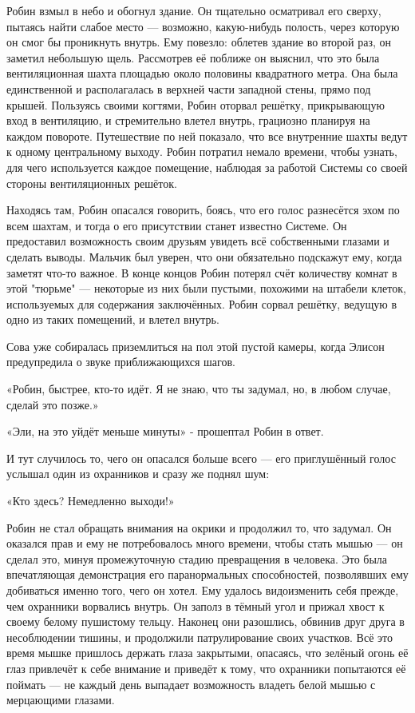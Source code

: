 \documentclass[a4paper,12pt]{book}
\begin{document}
\par
Робин взмыл в небо и обогнул здание. Он тщательно осматривал его сверху, пытаясь найти слабое место — возможно, какую-нибудь полость, через которую он смог бы проникнуть внутрь. Ему повезло: облетев здание во второй раз, он заметил небольшую щель. Рассмотрев её поближе он выяснил, что это была вентиляционная шахта площадью около половины квадратного метра. Она была единственной и располагалась в верхней части западной стены, прямо под крышей. Пользуясь своими когтями, Робин оторвал решётку, прикрывающую вход в вентиляцию, и стремительно влетел внутрь, грациозно планируя на каждом повороте. Путешествие по ней показало, что все внутренние шахты ведут к одному центральному выходу. Робин потратил немало времени, чтобы узнать, для чего используется каждое помещение, наблюдая за работой Системы со своей стороны вентиляционных решёток.
\par
Находясь там, Робин опасался говорить, боясь, что его голос разнесётся эхом по всем шахтам, и тогда о его присутствии станет известно Системе. Он предоставил возможность своим друзьям увидеть всё собственными глазами и сделать выводы. Мальчик был уверен, что они обязательно подскажут ему, когда заметят что-то важное. В конце концов Робин потерял счёт количеству комнат в этой "тюрьме" — некоторые из них были пустыми, похожими на штабели клеток, используемых для содержания заключённых. Робин сорвал решётку, ведущую в одно из таких помещений, и влетел внутрь.\\
\par
Сова уже собиралась приземлиться на пол этой пустой камеры, когда Элисон предупредила о звуке приближающихся шагов.
\par
«Робин, быстрее, кто-то идёт. Я не знаю, что ты задумал, но, в любом случае, сделай это позже.»
\par
«Эли, на это уйдёт меньше минуты» - прошептал Робин в ответ.
\par
И тут случилось то, чего он опасался больше всего — его приглушённый голос услышал один из охранников и сразу же поднял шум:
\par
«Кто здесь? Немедленно выходи!»
\par
Робин не стал обращать внимания на окрики и продолжил то, что задумал. Он оказался прав и ему не потребовалось много времени, чтобы стать мышью — он сделал это, минуя промежуточную стадию превращения в человека. Это была впечатляющая демонстрация его паранормальных способностей, позволявших ему добиваться именно того, чего он хотел. Ему удалось видоизменить себя прежде, чем охранники ворвались внутрь. Он заполз в тёмный угол и прижал хвост к своему белому пушистому тельцу. Наконец они разошлись, обвинив друг друга в несоблюдении тишины, и продолжили патрулирование своих участков. Всё это время мышке пришлось держать глаза закрытыми, опасаясь, что зелёный огонь её глаз привлечёт к себе внимание и приведёт к тому, что охранники попытаются её поймать — не каждый день выпадает возможность владеть белой мышью с мерцающими глазами.
\end{document}
